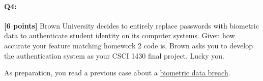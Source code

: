 \documentclass[11pt]{article}
\begin{document}
\begin{enumerate}[(a)]
\end{enumerate}

\pagebreak



\paragraph{Q4:} \textbf{[6 points]} Brown University decides to entirely replace passwords with biometric data to authenticate student identity on its computer systems. Given how accurate your feature matching homework 2 code is, Brown asks you to develop the authentication system as your CSCI 1430 final project. Lucky you.

As preparation, you read a previous case about a \href{https://www.vpnmentor.com/blog/report-biostar2-leak/}{biometric data breach}.
\end{document}
